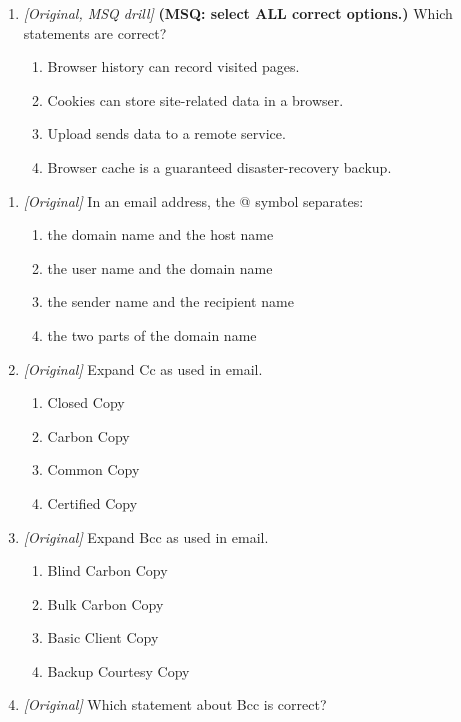 \begin{enumerate}[label=\textbf{Q\arabic*.}, leftmargin=*]
\item \textit{[Original, MSQ drill]} \textbf{(MSQ: select ALL correct options.)} Which statements are correct?
  \begin{enumerate}[label=\Alph*.]
\item Browser history can record visited pages.
   \item Cookies can store site-related data in a browser.
   \item Upload sends data to a remote service.
   \item Browser cache is a guaranteed disaster-recovery backup.
  \end{enumerate}

\end{enumerate}
\begin{enumerate}[label=\textbf{Q\arabic*.}, leftmargin=*]
\item \textit{[Original]} In an email address, the @ symbol separates:
  \begin{enumerate}[label=\Alph*.]
    \item the domain name and the host name
    \item the user name and the domain name
    \item the sender name and the recipient name
    \item the two parts of the domain name
  \end{enumerate}
\item \textit{[Original]} Expand Cc as used in email.
  \begin{enumerate}[label=\Alph*.]
    \item Closed Copy
    \item Carbon Copy
    \item Common Copy
    \item Certified Copy
  \end{enumerate}
\item \textit{[Original]} Expand Bcc as used in email.
  \begin{enumerate}[label=\Alph*.]
    \item Blind Carbon Copy
    \item Bulk Carbon Copy
    \item Basic Client Copy
    \item Backup Courtesy Copy
  \end{enumerate}
\item \textit{[Original]} Which statement about Bcc is correct?
  \begin{enumerate}[label=\Alph*.]

\end{enumerate}
\end{enumerate}
